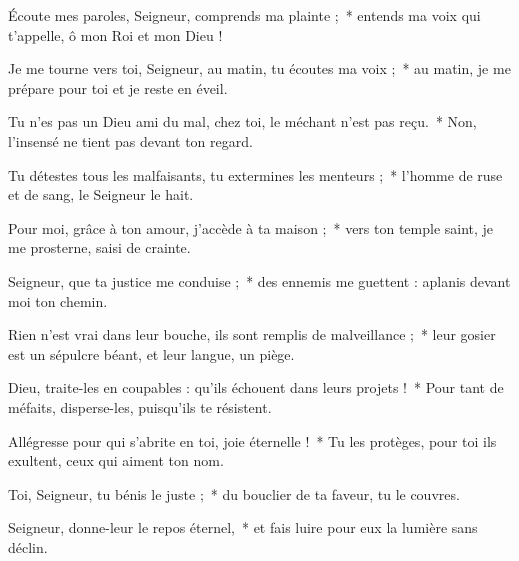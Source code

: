 \item Écoute mes paroles, Seigneur, comprends ma plainte ;~* entends ma voix qui t'appelle, ô mon Roi et mon Dieu !

\item Je me tourne vers toi, Seigneur, au matin, tu écoutes ma voix ;~* au matin, je me prépare pour toi et je reste en éveil.

\item Tu n'es pas un Dieu ami du mal, chez toi, le méchant n'est pas reçu.~* Non, l'insensé ne tient pas devant ton regard. 

\item Tu détestes tous les malfaisants, tu extermines les menteurs ;~* l'homme de ruse et de sang, le Seigneur le hait.

\item Pour moi, grâce à ton amour, j'accède à ta maison ;~* vers ton temple saint, je me prosterne, saisi de crainte.

\item Seigneur, que ta justice me conduise ;~* des ennemis me guettent : aplanis devant moi ton chemin.

\item Rien n'est vrai dans leur bouche, ils sont remplis de malveillance ;~* leur gosier est un sépulcre béant, et leur langue, un piège.

\item Dieu, traite-les en coupables : qu'ils échouent dans leurs projets !~* Pour tant de méfaits, disperse-les, puisqu'ils te résistent.

\item Allégresse pour qui s'abrite en toi, joie éternelle !~* Tu les protèges, pour toi ils exultent, ceux qui aiment ton nom.

\item Toi, Seigneur, tu bénis le juste ;~* du bouclier de ta faveur, tu le couvres.

\item Seigneur, donne-leur le repos éternel,~* et fais luire pour eux la lumière sans déclin.